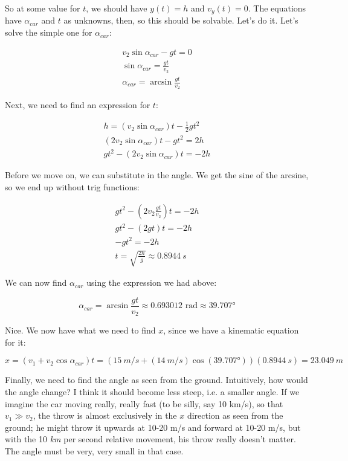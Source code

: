 \documentclass[8.01x]{subfiles}
\begin{document}
So at some value for $t$, we should have $y(t) = h$ and $v_y(t) = 0$. The equations have $\alpha_{car}$ and $t$ as unknowns, then, so this should be solvable. Let's do it. Let's solve the simple one for $\alpha_{car}$:

\begin{align}
v_2 \sin \alpha_{car} - g t = 0\\
\sin \alpha_{car} = \frac{g t}{v_2}\\
\alpha_{car} = \arcsin \frac{g t}{v_2}
\end{align}

Next, we need to find an expression for $t$:

\begin{align}
h = (v_2 \sin \alpha_{car}) t - \frac{1}{2} g t^2\\
(2 v_2 \sin \alpha_{car}) t - g t^2 = 2h\\
g t^2 - (2 v_2 \sin \alpha_{car}) t = -2h
\end{align}

Before we move on, we can substitute in the angle. We get the sine of the arcsine, so we end up without trig functions:

\begin{align}
g t^2 - (2 v_2 \frac{g t}{v_2}) t = -2h\\
g t^2 - (2 g t) t = -2h\\
-g t^2 = -2h\\
t = \sqrt{\frac{2h}{g}} \approx \SI{0.8944}{s}
\end{align}

We can now find $\alpha_{car}$ using the expression we had above:

\begin{equation}
\alpha_{car} = \arcsin \frac{g t}{v_2} \approx 0.693012 \text{ rad} \approx \ang{39.707}
\end{equation}

Nice. We now have what we need to find $x$, since we have a kinematic equation for it:

\begin{equation}
x = (v_1  + v_2 \cos \alpha_{car}) t = (\SI{15}{m/s} + (\SI{14}{m/s}) \cos(\ang{39.707})) (\SI{0.8944}{s}) = \SI{23.049}{m}
\end{equation}

Finally, we need to find the angle as seen from the ground. Intuitively, how would the angle change? I think it should become less steep, i.e. a smaller angle. If we imagine the car moving really, really fast (to be silly, say 10 km/s), so that $v_1 \gg v_2$, the throw is almost exclusively in the $x$ direction as seen from the ground; he might throw it upwards at 10-20 m/s and forward at 10-20 m/s, but with the 10 \emph{km} per second relative movement, his throw really doesn't matter. The angle must be very, very small in that case. 
\end{document}
